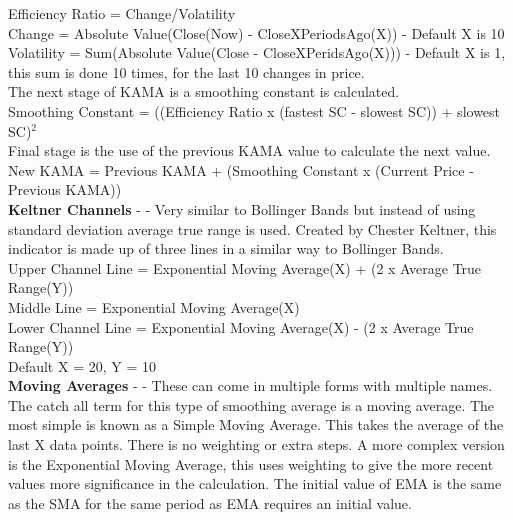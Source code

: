 \documentclass[12pt,a4paper]{article}
\begin{document}
\noindent
Efficiency Ratio = Change/Volatility\\
Change = Absolute Value(Close(Now) - CloseXPeriodsAgo(X)) - Default X is 10 \\
Volatility = Sum(Absolute Value(Close - CloseXPeridsAgo(X))) - Default X is 1, this sum is done 10 times, for the last 10 changes in price.\\

\noindent
The next stage of KAMA is a smoothing constant is calculated. \\

\noindent
Smoothing Constant = ((Efficiency Ratio x (fastest SC - slowest SC)) + slowest SC)$^2$\\

\noindent
Final stage is the use of the previous KAMA value to calculate the next value. \\

\noindent
New KAMA = Previous KAMA + (Smoothing Constant x (Current Price - Previous KAMA))\\

\iffalse
[]
\fi

\noindent
\textbf{Keltner Channels} - \cite{Keltner1960} - Very similar to Bollinger Bands but instead of using standard deviation average true range is used. Created by Chester Keltner, this indicator is made up of three lines in a similar way to Bollinger Bands.\\

\noindent
Upper Channel Line = Exponential Moving Average(X) + (2 x Average True Range(Y))\\
Middle Line = Exponential Moving Average(X)\\
Lower Channel Line = Exponential Moving Average(X) - (2 x Average True Range(Y))\\ Default X = 20, Y = 10 \\

\iffalse
[]
\fi

\noindent
\textbf{Moving Averages} - \cite{Murphy1999} - These can come in multiple forms with multiple names. The catch all term for this type of smoothing average is a moving average. The most simple is known as a Simple Moving Average. This takes the average of the last X data points. There is no weighting or extra steps. A more complex version is the Exponential Moving Average, this uses weighting to give the more recent values more significance in the calculation. The initial value of EMA is the same as the SMA for the same period as EMA requires an initial value.\\
\end{document}
